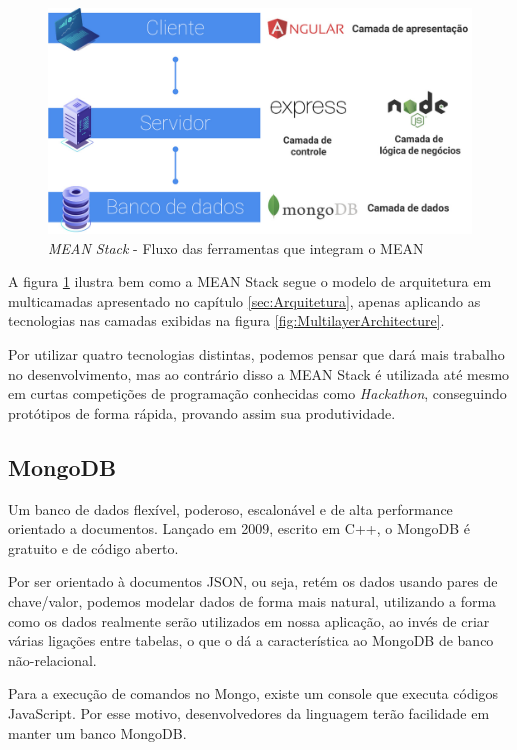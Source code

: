 \documentclass[
	12pt,				%
	openright,			%
	twoside,			%
	a4paper,			%
	english,			%
	brazil				%
	]{abntex2}
\begin{document}
\begin{figure}[h]
	\centering

	\caption{\textit{MEAN Stack} - Fluxo das ferramentas que integram o MEAN} \label{fig:MEANStackFlow}
    \includegraphics[scale=0.3]{mean-stack-flow}

\end{figure}

A figura \ref{fig:MEANStackFlow} ilustra bem como a MEAN Stack segue o modelo de arquitetura em multicamadas apresentado no capítulo \ref{sec:Arquitetura}, apenas aplicando as tecnologias nas camadas exibidas na figura \ref{fig:MultilayerArchitecture}.

Por utilizar quatro tecnologias distintas, podemos pensar que dará mais trabalho no desenvolvimento, mas ao contrário disso a MEAN Stack é utilizada até mesmo em curtas competições de programação conhecidas como \textit{Hackathon}, conseguindo protótipos de forma rápida, provando assim sua produtividade.

\subsection{MongoDB}

Um banco de dados flexível, poderoso, escalonável e de alta performance orientado a documentos. Lançado em 2009, escrito em C++, o MongoDB é gratuito e de código aberto.

Por ser orientado à documentos JSON, ou seja, retém os dados usando pares de chave/valor, podemos modelar dados de forma mais natural, utilizando a forma como os dados realmente serão utilizados em nossa aplicação, ao invés de criar várias ligações entre tabelas, o que o dá a característica ao MongoDB de banco não-relacional.

Para a execução de comandos no Mongo, existe um console que executa códigos JavaScript. Por esse motivo, desenvolvedores da linguagem terão facilidade em manter um banco MongoDB.
\end{document}
